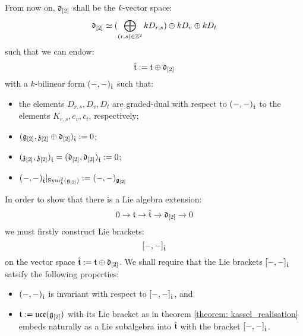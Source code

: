         \begin{convention} \label{conv: orthogonal_complement_of_toroidal_centres}
            From now on, $\mathfrak{d}_{[2]}$ shall be the $k$-vector space:
                $$\mathfrak{d}_{[2]} \simeq ( \bigoplus_{(r, s) \in \mathbb{Z}^2} k D_{r, s} ) \oplus k D_v \oplus k D_t$$
            such that we can endow:
                $$\hat{\mathfrak{t}} := \mathfrak{t}\oplus \mathfrak{d}_{[2]}$$
            with a $k$-bilinear form $(-, -)_{\hat{\mathfrak{t}}}$ such that:
            \begin{itemize}
                \item the elements $D_{r, s}, D_v, D_t$ are graded-dual with respect to $(-, -)_{\hat{\mathfrak{t}}}$ to the elements $K_{r, s}, c_v, c_t$, respectively;
                \item $(\mathfrak{g}_{[2]}, \mathfrak{z}_{[2]} \oplus \mathfrak{d}_{[2]})_{\hat{\mathfrak{t}}} := 0$;
                \item $(\mathfrak{z}_{[2]}, \mathfrak{z}_{[2]})_{\hat{\mathfrak{t}}} = (\mathfrak{d}_{[2]}, \mathfrak{d}_{[2]})_{\hat{\mathfrak{t}}} := 0$;
                \item $(-, -)_{\hat{\mathfrak{t}}}|_{\mathrm{Sym}^2_k(\mathfrak{g}_{[2]})} := (-, -)_{\mathfrak{g}_{[2]}}$
            \end{itemize}
        \end{convention}

        In order to show that there is a Lie algebra extension:
            $$0 \to \mathfrak{t} \to \hat{\mathfrak{t}} \to \mathfrak{d}_{[2]} \to 0$$
        we must firstly construct Lie brackets:
            $$[-, -]_{\hat{\mathfrak{t}}}$$
        on the vector space $\hat{\mathfrak{t}} := \mathfrak{t} \oplus \mathfrak{d}_{[2]}$. We shall require that the Lie brackets $[-, -]_{\hat{\mathfrak{t}}}$ satsify the following properties:
        \begin{itemize}
            \item $(-, -)_{\hat{\mathfrak{t}}}$ is invariant with respect to $[-, -]_{\hat{\mathfrak{t}}}$, and
            \item $\mathfrak{t} := \mathfrak{uce}(\mathfrak{g}_{[2]})$ with its Lie bracket as in theorem \ref{theorem: kassel_realisation} embeds naturally as a Lie subalgebra into $\hat{\mathfrak{t}}$ with the bracket $[-, -]_{\hat{\mathfrak{t}}}$. 
        \end{itemize}


